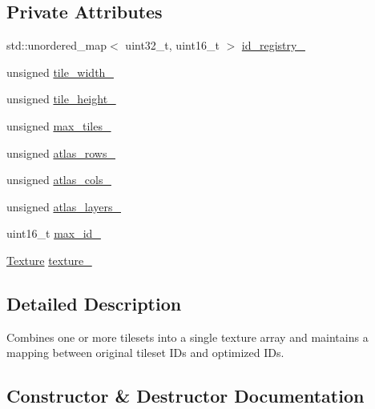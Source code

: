 \subsection*{Private Attributes}
\begin{DoxyCompactItemize}
\item 
std\+::unordered\+\_\+map$<$ uint32\+\_\+t, uint16\+\_\+t $>$ \hyperlink{classpixel_1_1_tile_atlas_a4f0954f5c32403c84a9c0172adea29cc}{id\+\_\+registry\+\_\+}
\item 
unsigned \hyperlink{classpixel_1_1_tile_atlas_a03f53cf1b9bd75e4f02cff6907f074a8}{tile\+\_\+width\+\_\+}
\item 
unsigned \hyperlink{classpixel_1_1_tile_atlas_a6df6a1d935e21370975029291196e2da}{tile\+\_\+height\+\_\+}
\item 
unsigned \hyperlink{classpixel_1_1_tile_atlas_a8ef963f5bd684f5c180b7efb9c662183}{max\+\_\+tiles\+\_\+}
\item 
unsigned \hyperlink{classpixel_1_1_tile_atlas_a68dee9e69a708871a34606a0b5250c5a}{atlas\+\_\+rows\+\_\+}
\item 
unsigned \hyperlink{classpixel_1_1_tile_atlas_abc7626bf6b8b80a2f2fa2005236af27b}{atlas\+\_\+cols\+\_\+}
\item 
unsigned \hyperlink{classpixel_1_1_tile_atlas_af76d22ff6a5c60a535704b97c3faf336}{atlas\+\_\+layers\+\_\+}
\item 
uint16\+\_\+t \hyperlink{classpixel_1_1_tile_atlas_a400156b86a72338e1ab28050451a50d1}{max\+\_\+id\+\_\+}
\item 
\hyperlink{classpixel_1_1graphics_1_1_texture}{Texture} \hyperlink{classpixel_1_1_tile_atlas_ae8a6a2c5ef5ba5ec62074fe9ef6f46a5}{texture\+\_\+}
\end{DoxyCompactItemize}


\subsection{Detailed Description}
Combines one or more tilesets into a single texture array and maintains a mapping between original tileset I\+Ds and optimized I\+Ds. 

\subsection{Constructor \& Destructor Documentation}
\mbox{\label{classpixel_1_1_tile_atlas_a1a93c32c0436c245eb8a542c4130aaed}} 
